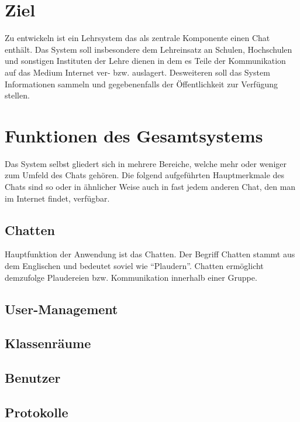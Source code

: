 \section{Ziel}

Zu entwickeln ist ein Lehrsystem das als zentrale Komponente einen Chat enth\"alt. Das System
soll insbesondere dem Lehreinsatz an Schulen, Hochschulen und sonstigen Instituten der
Lehre dienen in dem es Teile der Kommunikation auf das Medium Internet ver- bzw. auslagert.
 Desweiteren soll das System Informationen sammeln und gegebenenfalls der \"Offentlichkeit
zur Verf\"ugung stellen. 

\section{Funktionen des Gesamtsystems}
Das System selbst gliedert sich in mehrere Bereiche, welche mehr oder weniger 
zum Umfeld des Chats geh\"oren. Die folgend aufgef\"uhrten Hauptmerkmale des Chats sind so oder
in \"ahnlicher Weise auch in fast jedem anderen Chat, den man im Internet findet, verf\"ugbar.

\subsection{Chatten}
Hauptfunktion der Anwendung ist das Chatten. Der Begriff Chatten stammt aus dem Englischen
und bedeutet soviel wie ``Plaudern''. Chatten erm\"oglicht demzufolge Plaudereien bzw. Kommunikation
innerhalb einer Gruppe.

\subsection{User-Management}



\subsection{Klassenr\"aume}



\subsection{Benutzer}

\subsection{Protokolle}

